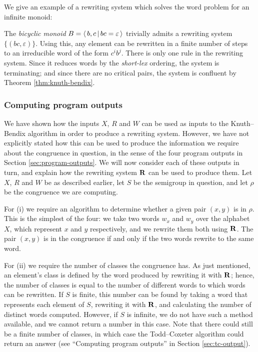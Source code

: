 We give an example of a rewriting system which solves the word problem for an
infinite monoid:

\begin{example}
  \label{ex:bicyclic}
  The \textit{bicyclic monoid} $B = \left\langle \, b,c \, \middle| \, bc=\varepsilon \, \right\rangle$ trivially admits
  a rewriting system $\{(bc, \varepsilon)\}$.  Using this, any element can be
  rewritten in a finite number of steps to an irreducible word of the form
  $c^ib^j$.  There is only one rule in the rewriting system.  Since it reduces
  words by the \textit{short-lex} ordering, the system is terminating; and since
  there are no critical pairs, the system is confluent by Theorem
  \ref{thm:knuth-bendix}.
\end{example}

\subsubsection{Computing program outputs}
\label{sec:kb-output}
We have shown how the inputs $X$, $R$ and $W$ can be used as inputs to the
Knuth--Bendix algorithm in order to produce a rewriting system.  However, we
have not explicitly stated how this can be used to produce the information we
require about the congruence in question, in the sense of the four program
outputs in Section \ref{sec:program-outputs}.  We will now consider each of
these outputs in turn, and explain how the rewriting system $\mathbf{R}$ can be used
to produce them.  Let $X$, $R$ and $W$ be as described earlier, let $S$ be the
semigroup in question, and let $\rho$ be the congruence we are computing.

For (i) we require an algorithm to determine whether a given pair $(x,y)$ is in
$\rho$.  This is the simplest of the four: we take two words $w_x$ and $w_y$
over the alphabet $X$, which represent $x$ and $y$ respectively, and we rewrite
them both using $\mathbf{R}$.  The pair $(x,y)$ is in the congruence if and only if
the two words rewrite to the same word.

For (ii) we require the number of classes the congruence has.  As just
mentioned, an element's class is defined by the word produced by rewriting it
with $\mathbf{R}$; hence, the number of classes is equal to the number of different
words to which words can be rewritten.  If $S$ is finite, this number can be
found by taking a word that represents each element of $S$, rewriting it with
$\mathbf{R}$, and calculating the number of distinct words computed.  However, if $S$
is infinite, we do not have such a method available, and we cannot return a
number in this case.  Note that there could still be a finite number of classes,
in which case the Todd--Coxeter algorithm could return an answer (see
``Computing program outputs'' in Section \ref{sec:tc-output}).

